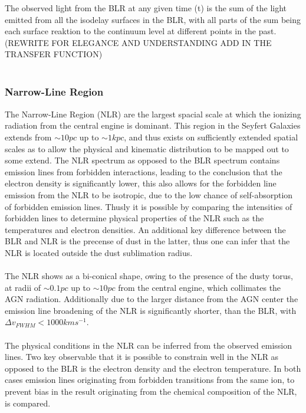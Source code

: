 \documentclass[11pt]{article}
\begin{document}
The observed light from the BLR at any given time (t) is the sum of the light emitted from all the isodelay surfaces in the BLR, with all parts of the sum being each surface reaktion to the continuum level at different points in the past. (REWRITE FOR ELEGANCE AND UNDERSTANDING ADD IN THE TRANSFER FUNCTION)\\
\\
\subsubsection{Narrow-Line Region}
The Narrow-Line Region (NLR) are the largest spacial scale at which the ionizing radiation from the central engine is dominant. This region in the Seyfert Galaxies extends from $\sim 10 pc$ up to $\sim 1 kpc$, and thus exists on sufficiently extended spatial scales as to allow the physical and kinematic distribution to be mapped out to some extend. The NLR spectrum as opposed to the BLR spectrum contains emission lines from forbidden interactions, leading to the conclusion that the electron density is significantly lower, this also allows for the forbidden line emission from the NLR to be isotropic, due to the low chance of self-absorption of forbidden emission lines. Thusly it is possible by comparing the intensities of forbidden lines to determine physical properties of the NLR such as the temperatures and electron densities. An additional key difference between the BLR and NLR is the precense of dust in the latter, thus one can infer that the NLR is located outside the dust sublimation radius.\\
\\
The NLR shows as a bi-conical shape, owing to the presence of the dusty torus, at radii of $\sim 0.1 pc$ up to $\sim 10 pc$ from the central engine, which collimates the AGN radiation. Additionally due to the larger distance from the AGN center the emission line broadening of the NLR is significantly shorter, than the BLR, with $\Delta v_{FWHM} < 1000 kms^{-1}$.\\
\\
The physical conditions in the NLR can be inferred from the observed emission lines. Two key observable that it is possible to constrain well in the NLR as opposed to the BLR is the electron density and the electron temperature. In both cases emission lines originating from forbidden transitions from the same ion, to prevent bias in the result originating from the chemical composition of the NLR, is compared.
\end{document}
